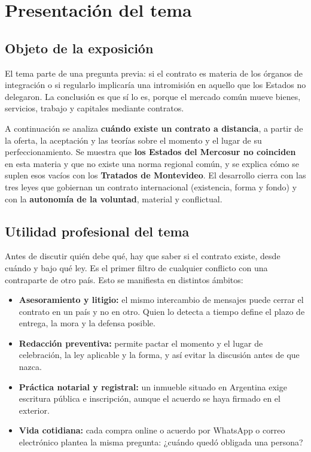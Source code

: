 \documentclass[12pt,oneside]{book}
\begin{document}

\chapter[Presentación del tema]{Presentación del tema}

\section{Objeto de la exposición}

El tema parte de una pregunta previa: si el contrato es materia de los órganos de integración o si regularlo implicaría una intromisión en aquello que los Estados no delegaron. La conclusión es que sí lo es, porque el mercado común mueve bienes, servicios, trabajo y capitales mediante contratos.

A continuación se analiza \textbf{cuándo existe un contrato a distancia}, a partir de la oferta, la aceptación y las teorías sobre el momento y el lugar de su perfeccionamiento. Se muestra que \textbf{los Estados del Mercosur no coinciden} en esta materia y que no existe una norma regional común, y se explica cómo se suplen esos vacíos con los \textbf{Tratados de Montevideo}. El desarrollo cierra con las tres leyes que gobiernan un contrato internacional (existencia, forma y fondo) y con la \textbf{autonomía de la voluntad}, material y conflictual.

\section{Utilidad profesional del tema}

Antes de discutir quién debe qué, hay que saber si el contrato existe, desde cuándo y bajo qué ley. Es el primer filtro de cualquier conflicto con una contraparte de otro país. Esto se manifiesta en distintos ámbitos:

\begin{itemize}
    \item \textbf{Asesoramiento y litigio:} el mismo intercambio de mensajes puede cerrar el contrato en un país y no en otro. Quien lo detecta a tiempo define el plazo de entrega, la mora y la defensa posible.
    \item \textbf{Redacción preventiva:} permite pactar el momento y el lugar de celebración, la ley aplicable y la forma, y así evitar la discusión antes de que nazca.
    \item \textbf{Práctica notarial y registral:} un inmueble situado en Argentina exige escritura pública e inscripción, aunque el acuerdo se haya firmado en el exterior.
    \item \textbf{Vida cotidiana:} cada compra online o acuerdo por WhatsApp o correo electrónico plantea la misma pregunta: ¿cuándo quedó obligada una persona?
\end{itemize}
\end{document}
